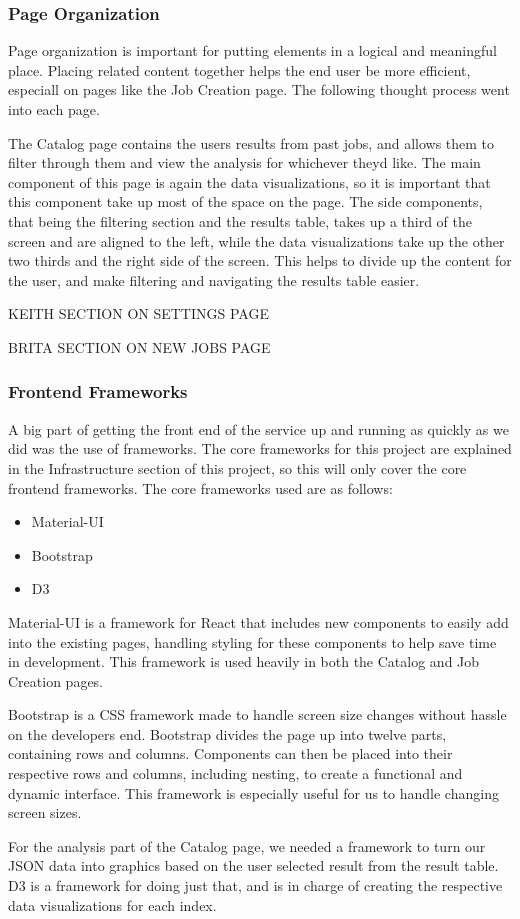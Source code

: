 \subsubsection{Page Organization}
Page organization is important for putting elements in a logical and meaningful place. Placing related content together helps the end user be more efficient, especiall on pages like the Job Creation page. The following thought process went into each page.\par
The Catalog page contains the user\textquotesingle s results from past jobs, and allows them to filter through them and view the analysis for whichever they\textquotesingle d like. The main component of this page is again the data visualizations, so it is important that this component take up most of the space on the page. The side components, that being the filtering section and the results table, takes up a third of the screen and are aligned to the left, while the data visualizations take up the other two thirds and the right side of the screen. This helps to divide up the content for the user, and make filtering and navigating the results table easier.\par
KEITH SECTION ON SETTINGS PAGE\par
BRITA SECTION ON NEW JOBS PAGE

\subsubsection{Frontend Frameworks}
A big part of getting the front end of the service up and running as quickly as we did was the use of frameworks. The core frameworks for this project are explained in the Infrastructure section of this project, so this will only cover the core frontend frameworks. The core frameworks used are as follows:
\begin{itemize}
  \item Material-UI
  \item Bootstrap
  \item D3
\end{itemize}
Material-UI is a framework for React that includes new components to easily add into the existing pages, handling styling for these components to help save time in development. This framework is used heavily in both the Catalog and Job Creation pages.\par
Bootstrap is a CSS framework made to handle screen size changes without hassle on the developer\textquotesingle s end. Bootstrap divides the page up into twelve parts, containing rows and columns. Components can then be placed into their respective rows and columns, including nesting, to create a functional and dynamic interface. This framework is especially useful for us to handle changing screen sizes.\par
For the analysis part of the Catalog page, we needed a framework to turn our JSON data into graphics based on the user selected result from the result table. D3 is a framework for doing just that, and is in charge of creating the respective data visualizations for each index.
